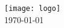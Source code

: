 \begin{titlepage}
\texttt{[image: logo]}\\[1cm]

\vspace{1 cm}
{\large \today}\\[3cm] %


\vfill %

\end{titlepage}
